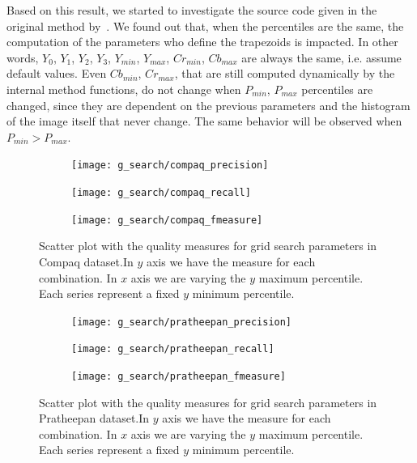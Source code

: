 Based on this result, we started to investigate the source code given in the original method by~\citet{brancati:17}. We found out that, when the percentiles are the same, the computation of the parameters who define the trapezoids is impacted. In other words, $Y_0$, $Y_1$, $Y_2$, $Y_3$, $Y_{min}$, $Y_{max}$, $Cr_{min}$, $Cb_{max}$ are always the same, i.e. assume default values. Even $Cb_{min}$, $Cr_{max}$, that are still computed dynamically by the internal method functions, do not change when $P_{min}$, $P_{max}$ percentiles are changed, since they are dependent on the previous parameters and the histogram of the image itself that never change. The same behavior will be observed when $P_{min} > P_{max}$.

\clearpage %
\begin{figure}[!htb]
    \centering
    \begin{subfigure}[t]{0.95\textwidth}
        \texttt{[image: g\_search/compaq\_precision]}
    \end{subfigure}
    \begin{subfigure}[t]{0.95\textwidth}
        \texttt{[image: g\_search/compaq\_recall]}
    \end{subfigure}
    \begin{subfigure}[t]{0.95\textwidth}
        \texttt{[image: g\_search/compaq\_fmeasure]}
    \end{subfigure}
    \caption[Scatter plot with the quality measures for grid search parameters in Compaq dataset]{Scatter plot with the quality measures for grid search parameters in Compaq dataset.In $y$ axis we have the measure for each combination. In $x$ axis we are varying the $y$ maximum percentile. Each series represent a fixed $y$ minimum percentile.}
    \label{fig:compaq_g_search}
\end{figure}


\clearpage %
\begin{figure}[!htb]
    \centering
    \begin{subfigure}[t]{0.95\textwidth}
        \texttt{[image: g\_search/pratheepan\_precision]}
    \end{subfigure}
    \begin{subfigure}[t]{0.95\textwidth}
        \texttt{[image: g\_search/pratheepan\_recall]}
    \end{subfigure}
    \begin{subfigure}[t]{0.95\textwidth}
        \texttt{[image: g\_search/pratheepan\_fmeasure]}
    \end{subfigure}
    \caption[Scatter plot with the quality measures for grid search parameters in Pratheepan dataset]{Scatter plot with the quality measures for grid search parameters in Pratheepan dataset.In $y$ axis we have the measure for each combination. In $x$ axis we are varying the $y$ maximum percentile. Each series represent a fixed $y$ minimum percentile.}
    \label{fig:pratheepan_g_search}
\end{figure}


